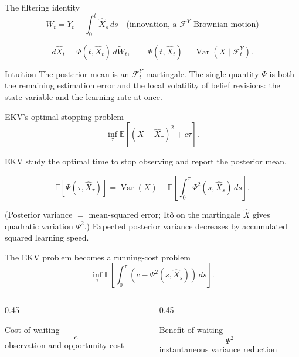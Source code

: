 \documentclass[aspectratio=169,10pt]{beamer}
\newcommand{\E}{\mathbb{E}}
\newcommand{\Var}{\operatorname{Var}}
\newcommand{\F}{\mathcal{F}}
\newcommand{\dd}{\,d}
\newcommand{\wh}{\widehat}
\newcommand{\wt}{\widetilde}
\newcommand{\1}{\mathbf{1}}
\begin{document}
\begin{frame}{The filtering identity}
  \Large
  \[
    \wt W_t
    =
    Y_t-\int_0^t\wh X_s\,ds
    \quad\text{(innovation, a } \F^Y\text{-Brownian motion)}
  \]

  \vspace{0.4em}

  \[
    d\wh X_t=\Psi(t,\wh X_t)\,d\wt W_t,
    \qquad
    \Psi(t,\wh X_t)=\Var(X\mid \F_t^Y).
  \]

  \vspace{0.6em}
  \begin{block}{Intuition}
    The posterior mean is an \(\F_t^Y\)-martingale. The single quantity \(\Psi\) is both the
    remaining estimation error and the local volatility of belief revisions: the state
    variable and the learning rate at once.
  \end{block}
\end{frame}

\begin{frame}{EKV's optimal stopping problem}
  \Large
  \[
    \inf_\tau
    \E\left[(X-\wh X_\tau)^2+c\tau\right].
  \]

  \vspace{0.7em}

  \normalsize
  EKV study the optimal time to stop observing and report the posterior mean.

  \pause
  \vspace{1.0em}
  \Large
  \[
    \E[\Psi(\tau,\wh X_\tau)]
    =
    \Var(X)
    -
    \E\!\left[\int_0^\tau \Psi^2(s,\wh X_s)\dd s\right].
  \]

  \vspace{0.4em}
  \footnotesize
  (Posterior variance \(=\) mean-squared error; Itô on the martingale \(\wh X\) gives
  quadratic variation \(\Psi^2\).) Expected posterior variance decreases by accumulated
  squared learning speed.
\end{frame}

\begin{frame}{The EKV problem becomes a running-cost problem}
  \Large
  \[
    \inf_\tau
    \E\left[
      \int_0^\tau
      \left(c-\Psi^2(s,\wh X_s)\right)\dd s
    \right].
  \]

  \vspace{1.0em}

  \begin{columns}[T,onlytextwidth]
    \begin{column}{0.45\textwidth}
      \begin{block}{Cost of waiting}
        \[
          c
        \]
        observation and opportunity cost
      \end{block}
    \end{column}
    \begin{column}{0.45\textwidth}
      \begin{block}{Benefit of waiting}
        \[
          \Psi^2
        \]
        instantaneous variance reduction
      \end{block}
    \end{column}
  \end{columns}
\end{frame}
\end{document}
